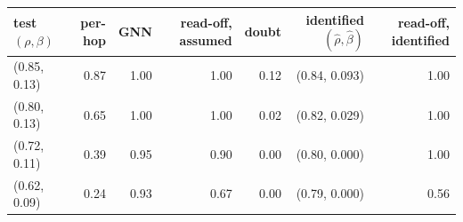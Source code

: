 \begin{center}\footnotesize\begin{tabular}{@{}lrrrrrr@{}}\toprule test $(\rho,\beta)$ & per-hop & GNN & read-off, assumed & doubt & identified $(\hat\rho,\hat\beta)$ & read-off, identified \\ \midrule
(0.85, 0.13) & 0.87 & 1.00 & 1.00 & 0.12 & (0.84, 0.093) & 1.00 \\
(0.80, 0.13) & 0.65 & 1.00 & 1.00 & 0.02 & (0.82, 0.029) & 1.00 \\
(0.72, 0.11) & 0.39 & 0.95 & 0.90 & 0.00 & (0.80, 0.000) & 1.00 \\
(0.62, 0.09) & 0.24 & 0.93 & 0.67 & 0.00 & (0.79, 0.000) & 0.56 \\
\bottomrule\end{tabular}\end{center}
\par\medskip
